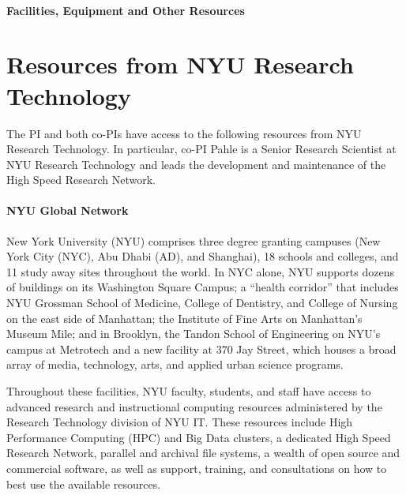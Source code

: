 \begin{center}
    {\large \bf \TITLE} \\
    {\bf Facilities, Equipment and Other Resources}
\end{center}



\section*{Resources from NYU Research Technology}

The PI and both co-PIs have access to the following resources from NYU Research Technology. In particular, co-PI Pahle is a Senior Research Scientist at NYU Research Technology and leads the development and maintenance of the High Speed Research Network.


\paragraph{NYU Global Network}
New York University (NYU) comprises three degree granting campuses (New York City (NYC), Abu Dhabi (AD), and Shanghai), 18 schools and colleges, and 11 study away sites throughout the world. In NYC alone, NYU supports dozens of buildings on its Washington Square Campus; a “health corridor” that includes NYU Grossman School of Medicine, College of Dentistry, and College of Nursing on the east side of Manhattan; the Institute of Fine Arts on Manhattan's Museum Mile; and in Brooklyn, the Tandon School of Engineering on NYU's campus at Metrotech and a new facility at 370 Jay Street, which houses a broad array of media, technology, arts, and applied urban science programs.

Throughout these facilities, NYU faculty, students, and staff have access to advanced research and instructional computing resources administered by the Research Technology division of NYU IT. These resources include High Performance Computing (HPC) and Big Data clusters, a dedicated High Speed Research Network, parallel and archival file systems, a wealth of open source and commercial software, as well as support, training, and consultations on how to best use the available resources.



